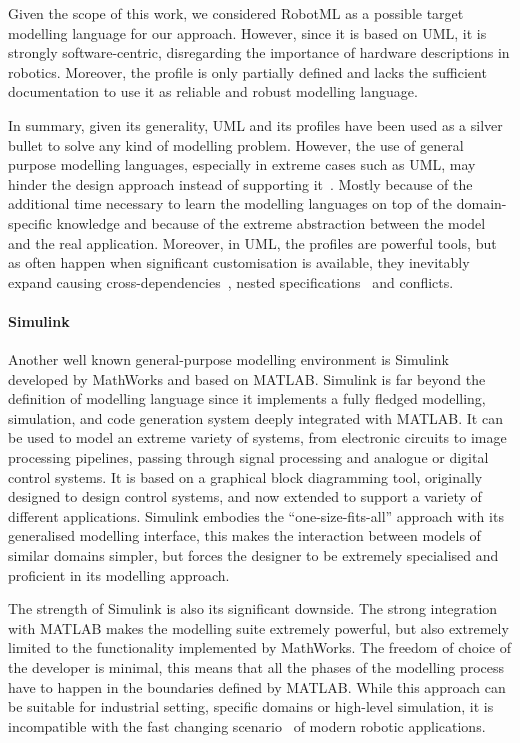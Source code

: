 Given the scope of this work, we considered RobotML as a possible target modelling language for our approach. However, since it is based on UML, it is strongly software-centric, disregarding the importance of hardware descriptions in robotics. Moreover, the profile is only partially defined and lacks the sufficient documentation to use it as reliable and robust modelling language.

In summary, given its generality, UML and its profiles have been used as a silver bullet to solve any kind of modelling problem. However, the use of general purpose modelling languages, especially in extreme cases such as UML, may hinder the design approach instead of supporting it~\cite{simons199930, bonnet2016not}. Mostly because of the additional time necessary to learn the modelling languages on top of the domain-specific knowledge and because of the extreme abstraction between the model and the real application. Moreover, in UML, the profiles are powerful tools, but as often happen when significant customisation is available, they inevitably expand causing cross-dependencies~\cite{espinoza2009challenges}, nested specifications~\cite{faugere2007marte} and conflicts.

\paragraph{Simulink} Another well known general-purpose modelling environment is Simulink~\cite{dabney2004mastering} developed by MathWorks and based on MATLAB. Simulink is far beyond the definition of modelling language since it implements a fully fledged modelling, simulation, and code generation system deeply integrated with MATLAB. It can be used to model an extreme variety of systems, from electronic circuits to image processing pipelines, passing through signal processing and analogue or digital control systems. It is based on a graphical block diagramming tool, originally designed to design control systems, and now extended to support a variety of different applications. Simulink embodies the ``one-size-fits-all'' approach with its generalised modelling interface, this makes the interaction between models of similar domains simpler, but forces the designer to be extremely specialised and proficient in its modelling approach.

The strength of Simulink is also its significant downside. The strong integration with MATLAB makes the modelling suite extremely powerful, but also extremely limited to the functionality implemented by MathWorks. The freedom of choice of the developer is minimal, this means that all the phases of the modelling process have to happen in the boundaries defined by MATLAB. While this approach can be suitable for industrial setting, specific domains or high-level simulation, it is incompatible with the fast changing scenario~\cite{cousins2011exponential} of modern robotic applications.

